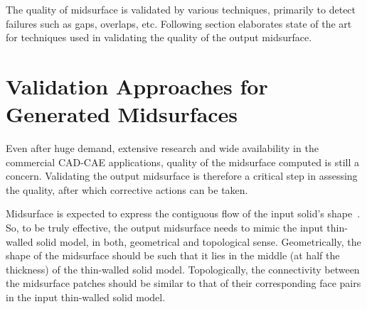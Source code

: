 The quality of midsurface is validated by various techniques, primarily to detect failures such as gaps, overlaps, etc.
Following section elaborates state of the art for techniques used in validating the quality of the output midsurface.

 
\section{Validation Approaches for Generated Midsurfaces} \label{sec:litsurvey:validation}

Even after huge demand, extensive research and wide availability in the commercial CAD-CAE applications, quality of the midsurface computed is still a concern. Validating the output midsurface is therefore a critical step in assessing the quality, after which corrective actions can be taken.

Midsurface is expected to express the contiguous flow of the input solid's shape~\cite{Rezayat1996}. So, to be truly effective, the output midsurface needs to mimic the input thin-walled solid model, in both, geometrical and topological sense. Geometrically, the shape of the midsurface should be such that it lies in the middle (at half the thickness) of the thin-walled solid model. Topologically, the connectivity between the midsurface patches should be similar to that of their corresponding face pairs in the input thin-walled solid model. 



